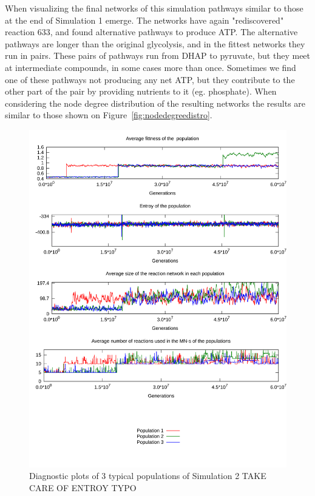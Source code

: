 \documentclass[a4paper,12pt]{article}
\begin{document}
When visualizing the final networks of this simulation pathways similar to those at the end of Simulation 1 emerge. The networks have again "rediscovered" reaction $633$, and found alternative pathways to produce ATP. The alternative pathways are longer than the original glycolysis, and in the fittest networks they run in pairs. These pairs of pathways run from DHAP to pyruvate, but they meet at intermediate compounds, in some cases more than once. Sometimes we find one of these pathways not producing any net ATP, but they contribute to the other part of the pair by providing nutrients to it (eg. phosphate). When considering the node degree distribution of the resulting networks the results are similar to those shown on Figure~\ref{fig:nodedegreedistro}. 


\begin{figure}[htpb]
	\centering
	\includegraphics[width=0.8\linewidth]{simulation2.pdf}
	\caption{Diagnostic plots of 3 typical populations of Simulation 2 TAKE CARE OF ENTROY TYPO}
	\label{fig:simulation2}
\end{figure}
\end{document}
